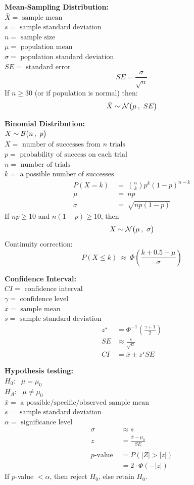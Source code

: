 \documentclass[12pt,letterpaper,addpoints]{exam}
\begin{document}
\begin{multicols}{2}
{\bf Mean-Sampling Distribution:}\\
$\bar{X} = \text{ sample mean}$\\
$s = \text{ sample standard deviation}$\\
$n = \text{ sample size}$\\
$\mu = \text{ population mean}$\\
$\sigma = \text{ population standard deviation}$\\
$SE = \text{ standard error}$
$$SE = \frac{\sigma}{\sqrt{n}} $$
If $n\ge 30$ (or if population is normal) then:
$$\bar{X} \sim \mathcal{N}\big(\mu\,,~SE\big) $$

\columnbreak

{\bf Binomial Distribution:}\\
$X \sim \mathcal{B}\big(n\,,~p\big)$\\
$X = \text{ number of successes from $n$ trials} $\\
$p = \text{ probability of success on each trial}$\\
$n = \text{ number of trials}$\\
$k = \text{ a possible number of successes}$
\begin{align*}
P(X=k) ~&=~ {n \choose k} p^k (1-p)^{n-k}\\
\mu ~&=~ np\\
\sigma ~&=~ \sqrt{np(1-p)} 
\end{align*}
If $np \ge 10$ and $n(1-p) \ge 10$, then
$$X \sim \mathcal{N}\big(\mu\,,~\sigma\big) $$
Continuity correction:
$$P(X \le k) ~\approx~ \Phi\left(\frac{k+0.5-\mu}{\sigma}\right)$$

{\bf Confidence Interval:}\\
$CI = \text{ confidence interval}$\\
$\gamma = \text{ confidence level}$\\
$\bar{x} = \text{ sample mean}$ \\
$s = \text{ sample standard deviation}$ 
\begin{align*}
z^{\star} &= \Phi^{-1}\left(\frac{\gamma+1}{2} \right) \\
SE &\approx \frac{s}{\sqrt{n}}\\
CI &= \bar{x} \pm z^{\star} SE
\end{align*}

{\bf Hypothesis testing:}\\
$H_0:~~~\mu = \mu_0$\\
$H_A:~~~\mu \ne \mu_0$\\
$\bar{x} = \text{ a possible/specific/observed sample mean}$\\
$s = \text{ sample standard deviation}$\\
$\alpha = \text{ significance level} $
\begin{align*}
\sigma &\approx s\\
z &= \frac{\bar{x}-\mu_0}{SE}\\\\
p\text{-value } &= P\left(\lvert Z \rvert > |z|  \right)\\
&= 2 \cdot \Phi\left( -|z| \right)
\end{align*}
If $p$-value $< \alpha$, then reject $H_0$, else retain $H_0$.

\end{multicols}
\end{document}

